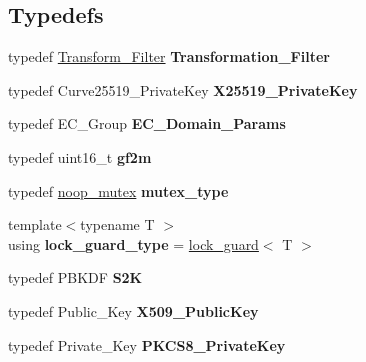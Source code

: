 \subsection*{Typedefs}
\begin{DoxyCompactItemize}
\item 
\mbox{\label{namespace_botan_a49f398856b09d29fedf055b9bb730357}} 
typedef \hyperlink{namespace_botan_a021ffc520728602cd2f027a40b68bc5f}{Transform\+\_\+\+Filter} {\bfseries Transformation\+\_\+\+Filter}
\item 
\mbox{\label{namespace_botan_a2c7f1f0b1e64d17eb434bd3f8e74d25b}} 
typedef Curve25519\+\_\+\+Private\+Key {\bfseries X25519\+\_\+\+Private\+Key}
\item 
\mbox{\label{namespace_botan_a5a6ad46a3e0235b7d8fa64faa2a9f17a}} 
typedef E\+C\+\_\+\+Group {\bfseries E\+C\+\_\+\+Domain\+\_\+\+Params}
\item 
\mbox{\label{namespace_botan_af61fe047bd15ac9f2f4c57d42a4aaf09}} 
typedef uint16\+\_\+t {\bfseries gf2m}
\item 
\mbox{\label{namespace_botan_ad384cce1c3c4736c4d48904dd6dc5061}} 
typedef \hyperlink{class_botan_1_1noop__mutex}{noop\+\_\+mutex} {\bfseries mutex\+\_\+type}
\item 
\mbox{\label{namespace_botan_a023d45026d17fdd648ae3d4a8b27c5ff}} 
{\footnotesize template$<$typename T $>$ }\\using {\bfseries lock\+\_\+guard\+\_\+type} = \hyperlink{class_botan_1_1lock__guard}{lock\+\_\+guard}$<$ T $>$
\item 
\mbox{\label{namespace_botan_a5205c90055f402fac271c40e30dd64ba}} 
typedef P\+B\+K\+DF {\bfseries S2K}
\item 
\mbox{\label{namespace_botan_add0fa31967ac5460a26278c11eb9142f}} 
typedef Public\+\_\+\+Key {\bfseries X509\+\_\+\+Public\+Key}
\item 
\mbox{\label{namespace_botan_aa653260f8a83c2d5905a709495f2b61c}} 
typedef Private\+\_\+\+Key {\bfseries P\+K\+C\+S8\+\_\+\+Private\+Key}

\end{DoxyCompactItemize}
